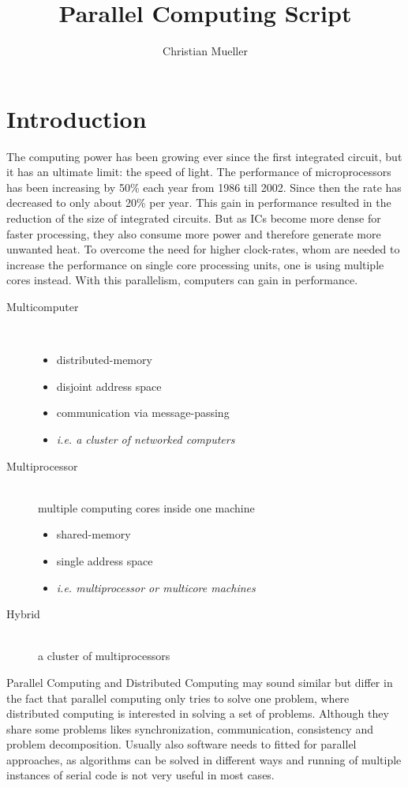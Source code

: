 \documentclass{article}
\author{Christian Mueller}
\title{Parallel Computing Script}
\begin{document}
\maktitle
\tableofcontents

\section{Introduction} %
\label{sec:introduction}
	The computing power has been growing ever since the first integrated circuit,
	but it has an ultimate limit: the speed of light.
	The performance of microprocessors has been increasing by 50\% each year from 1986 till 2002.
	Since then the rate has decreased to only about 20\% per year.
	This gain in performance resulted in the reduction of the size of integrated circuits.
	But as ICs become more dense for faster processing,
	they also consume more power and therefore generate more unwanted heat.
	To overcome the need for higher clock-rates,
	whom are needed to increase the performance on single core processing units,
	one is using multiple cores instead.
	With this parallelism, computers can gain in performance.
	
 	\begin{description}
 		\item[Multicomputer] \hfill \\
 			\begin{itemize}
 				\item distributed-memory
 				\item disjoint address space
 				\item communication via message-passing
 				\item \textsl{i.e. a cluster of networked computers}
 			\end{itemize}
 		\item[Multiprocessor] \hfill \\
 			multiple computing cores inside one machine\\
 			\begin{itemize}
 				\item shared-memory
 				\item single address space
 				\item \textsl{i.e. multiprocessor or multicore machines}
 			\end{itemize}
 		\item[Hybrid] \hfill \\
 			a cluster of multiprocessors
	\end{description}

	Parallel Computing and Distributed Computing may sound similar 
	but differ in the fact that parallel computing only tries to solve one problem,
	where distributed computing is interested in solving a set of problems.
	Although they share some problems likes synchronization,
	communication, consistency and problem decomposition.
	Usually also software needs to fitted for parallel approaches,
	as algorithms can be solved in different ways
	and running of multiple instances of serial code is not very useful in most cases.
\end{document}
